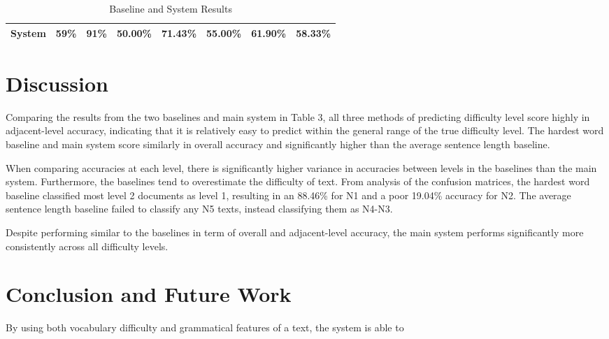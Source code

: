 \documentclass[12pt, a4paper]{article}
\begin{document}
\begin{table}[h!]
\begin{tabular}{|c|c|c|c|c|c|c|c|}
    System                                                                      & 59\%                                                        & 91\%                                                               & 50.00\%                                               & 71.43\%                                                & 55.00\%                                                & 61.90\%                                                & 58.33\%                                                \\ \hline
\end{tabular}
\caption{Baseline and System Results}
\label{tab:table3}
\end{table}

\section{Discussion}

Comparing the results from the two baselines and main system in Table 3, all 
three methods of predicting difficulty level score highly in adjacent-level accuracy, 
indicating that it is relatively easy to predict within the general range of the true difficulty level.
The hardest word baseline and main system score similarly in overall accuracy and significantly higher than
the average sentence length baseline. 
\par
When comparing accuracies at each level, there is significantly higher variance in accuracies between levels
in the baselines than the main system. Furthermore, the baselines tend to overestimate 
the difficulty of text. From analysis of the confusion matrices, the hardest word baseline
classified most level 2 documents as level 1, resulting in an 88.46\% for N1 and a poor 19.04\% accuracy for N2.
The average sentence length baseline failed to classify any N5 texts, instead classifying them as N4-N3.
\par
Despite performing similar to the baselines in term of overall and adjacent-level accuracy, 
the main system performs significantly more consistently across all difficulty levels. 
\par



\section{Conclusion and Future Work}

By using both vocabulary difficulty and grammatical features of a text, the system is 
able to 

\newpage



\end{document}
